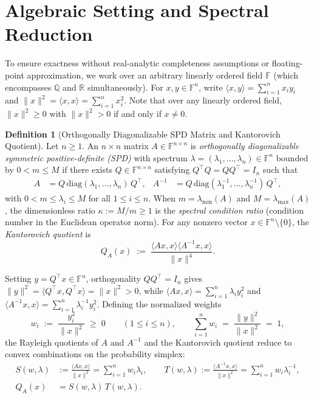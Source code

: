 \documentclass[11pt,a4paper]{article}
\theoremstyle{definition}
\newtheorem{definition}[theorem]{Definition}
\newcommand{\diag}{\mathrm{diag}}
\begin{document}
\section{Algebraic Setting and Spectral Reduction}
\label{sec:prelim}

To ensure exactness without real-analytic completeness assumptions or
floating-point approximation, we work over an arbitrary linearly ordered field
$\mathbb{F}$ (which encompasses $\mathbb{Q}$ and $\mathbb{R}$ simultaneously).
For $x, y \in \mathbb{F}^n$, write $\langle x, y \rangle = \sum_{i=1}^n x_i y_i$
and $\|x\|^2 = \langle x, x \rangle = \sum_{i=1}^n x_i^2$. Note that over any
linearly ordered field, $\|x\|^2 \ge 0$ with $\|x\|^2 > 0$ if and only if
$x \ne 0$.

\begin{definition}[Orthogonally Diagonalizable SPD Matrix and Kantorovich Quotient]
Let $n \ge 1$. An $n \times n$ matrix $A \in \mathbb{F}^{n \times n}$ is
\emph{orthogonally diagonalizable symmetric positive-definite (SPD)} with
spectrum $\lambda = (\lambda_1, \dots, \lambda_n) \in \mathbb{F}^n$ bounded by
$0 < m \le M$ if there exists $Q \in \mathbb{F}^{n \times n}$ satisfying
$Q^\top Q = Q Q^\top = I_n$ such that
\begin{align*}
  A &= Q\,\diag(\lambda_1, \dots, \lambda_n)\,Q^\top, &
  A^{-1} &= Q\,\diag(\lambda_1^{-1}, \dots, \lambda_n^{-1})\,Q^\top,
\end{align*}
with $0 < m \le \lambda_i \le M$ for all $1 \le i \le n$.
When $m = \lambda_{\min}(A)$ and $M = \lambda_{\max}(A)$, the dimensionless ratio
$\kappa := M/m \ge 1$ is the \emph{spectral condition ratio} (condition number in
the Euclidean operator norm). For any nonzero vector $x \in \mathbb{F}^n \setminus \{0\}$,
the \emph{Kantorovich quotient} is
\begin{equation}
  \label{eq:QA}
  Q_A(x) \;:=\; \frac{\langle Ax, x\rangle \langle A^{-1}x, x\rangle}{\|x\|^4}.
\end{equation}
\end{definition}

Setting $y = Q^\top x \in \mathbb{F}^n$, orthogonality $Q Q^\top = I_n$ gives
$\|y\|^2 = \langle Q^\top x, Q^\top x\rangle = \|x\|^2 > 0$, while
$\langle Ax, x\rangle = \sum_{i=1}^n \lambda_i y_i^2$ and
$\langle A^{-1}x, x\rangle = \sum_{i=1}^n \lambda_i^{-1} y_i^2$. Defining the
normalized weights
\[
  w_i \;:=\; \frac{y_i^2}{\|x\|^2} \;\ge\; 0 \qquad (1 \le i \le n), \qquad
  \sum_{i=1}^n w_i \;=\; \frac{\|y\|^2}{\|x\|^2} \;=\; 1,
\]
the Rayleigh quotients of $A$ and $A^{-1}$ and the Kantorovich quotient reduce to
convex combinations on the probability simplex:
\begin{align}
  S(w,\lambda) &:= \frac{\langle Ax, x\rangle}{\|x\|^2} = \sum_{i=1}^n w_i \lambda_i,
  \qquad
  T(w,\lambda) := \frac{\langle A^{-1}x, x\rangle}{\|x\|^2} = \sum_{i=1}^n w_i \lambda_i^{-1},
  \nonumber \\
  Q_A(x) &= S(w,\lambda)\,T(w,\lambda).
  \label{eq:ST}
\end{align}
\end{document}
